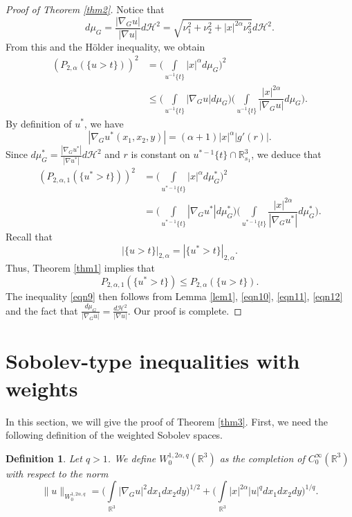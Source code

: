 \documentclass[10pt, reqno]{amsart}
\newtheorem{definition}{Definition}
\begin{document}
\begin{proof}[Proof of Theorem \ref{thm2}]
		Notice that
		$$d\mu_G = \dfrac{|\nabla_G u|}{|\nabla u|}d\mathcal{H}^2 = \sqrt{\nu_1^2 + \nu_2^2 + |x|^{2\alpha} \nu_3^2} d\mathcal{H}^2.$$
		From this and the H\"older inequality, we obtain
		\begin{align}\label{eqn10}
			\nonumber
			\left(P_{2,\alpha} (\{u>t\})\right)^2 & = \Bigg(\int\limits_{u^{-1} \{t\}} |x|^\alpha d\mu_G \Bigg)^2 \\
			& \leq \Bigg(\int\limits_{u^{-1} \{t\}} |\nabla_G u| d\mu_G \Bigg)\Bigg(\int\limits_{u^{-1} \{t\}} \dfrac{|x|^{2\alpha}}{|\nabla_G u|} d\mu_G \Bigg).
		\end{align}
		By definition of $u^*$, we have
		$$ |\nabla_G u^* (x_1,x_2,y)| = (\alpha+1)|x|^\alpha |g'(r)|. $$
		Since $d\mu^*_G = \frac{|\nabla_G u^*|}{|\nabla u^*|}d\mathcal{H}^2$ and $r$ is constant on $u^{*-1} \{t\} \cap \mathbb{R}^3_{s_1}$, we deduce that
		\begin{align}\label{eqn11}
			\nonumber
			\left(P_{2,\alpha,1} (\{u^*>t\})\right)^2 & = \Bigg(\int\limits_{u^{*-1} \{t\}} |x|^\alpha d\mu^*_G \Bigg)^2 \\
			& = \Bigg(\int\limits_{u^{*-1} \{t\}} |\nabla_G u^*| d\mu^*_G \Bigg)\Bigg(\int\limits_{u^{*-1} \{t\}} \dfrac{|x|^{2\alpha}}{|\nabla_G u^*|} d\mu^*_G \Bigg).
		\end{align}
		Recall that 
		$$ |\{u>t\}|_{2,\alpha} = |\{u^* > t\}|_{2,\alpha}.$$
		Thus, Theorem \ref{thm1} implies that 
		\begin{equation}\label{eqn12}
			P_{2,\alpha,1} (\{u^*>t\}) \leq P_{2,\alpha} (\{u > t\}).
		\end{equation}
		The inequality \eqref{eqn9} then follows from Lemma \ref{lem1}, \eqref{eqn10}, \eqref{eqn11}, \eqref{eqn12} and the fact that $\frac{d\mu_G}{|\nabla_G u|} = \frac{d\mathcal{H}^2}{|\nabla u|}$. Our proof is complete. 
	\end{proof}
	
	\section{Sobolev-type inequalities with weights}\label{sec3}
	
	In this section, we will give the proof of Theorem \ref{thm3}. First, we need the following definition of the weighted Sobolev spaces.
	
	\begin{definition}\label{def5}
		Let $q>1$. We define $W_0^{1,2\alpha,q} (\mathbb{R}^3)$ as the completion of $C^\infty_0(\mathbb{R}^3)$ with respect to the norm
		$$\|u\|_{W_0^{1,2\alpha,q}} =  \Bigg( \int\limits_{\mathbb{R}^3} |\nabla_G u|^2dx_1dx_2dy \Bigg)^{1/2} + \Bigg(\int\limits_{\mathbb{R}^3} |x|^{2\alpha}|u|^q dx_1dx_2dy \Bigg)^{1/q}.$$
	\end{definition}
	
\end{document}
